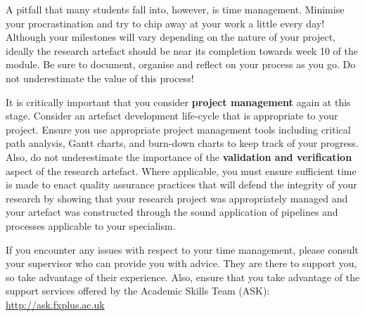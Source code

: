 A pitfall that many students fall into, however, is time management. Minimise your procrastination and try to chip away at your work a little every day! Although your milestones will vary depending on the nature of your project, ideally the research artefact should be near its completion towards week 10 of the module. Be sure to document, organise and reflect on your process as you go. Do not underestimate the value of this process! 

It is critically important that you consider \textbf{project management} again at this stage. Consider an artefact development life-cycle that is appropriate to your project. Ensure you use appropriate project management tools including critical path analysis, Gantt charts, and burn-down charts to keep track of your progress. Also, do not underestimate the importance of the \textbf{validation and verification} aspect of the research artefact. Where applicable, you must ensure sufficient time is made to enact quality assurance practices that will defend the integrity of your research by showing that your research project was appropriately managed and your artefact was constructed through the sound application of pipelines and processes applicable to your specialism.

If you encounter any issues with respect to your time management, please consult your supervisor who can provide you with advice. They are there to support you, so take advantage of their experience. Also, ensure that you take advantage of the support services offered by the Academic Skills Team (ASK): \url{http://ask.fxplus.ac.uk}
